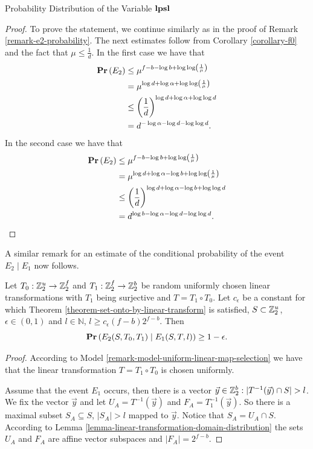 \begin{section}{Probability Distribution of the Variable \texorpdfstring{$\mathbf{lpsl}$}{lpsl}}
\begin{proof}
To prove the statement, we continue similarly as in the proof of Remark \ref{remark-e2-probability}. The next estimates follow from Corollary \ref{corollary-f0} and the fact that $\mu \leq \frac{1}{d}$. In the first case we have that
\[
\begin{split}
\mathbf{Pr}\left(E_2\right) 
	& \leq \mu ^ {f - b - \log b + \log \log \left( \frac{1}{\mu} \right)} \\
	& = \mu ^ {\log d + \log \alpha + \log \log \left( \frac{1}{\mu} \right)} \\
	& \leq \left(\frac{1}{d}\right) ^ {\log d + \log \alpha + \log \log d} \\
	& = d ^ {-\log \alpha - \log d - \log \log d} \text{.}
\end{split}
\]
In the second case we have that 
\[
\begin{split}
\mathbf{Pr}\left(E_2\right) 
	& \leq \mu ^ {f - b - \log b + \log \log \left( \frac{1}{\mu} \right)} \\
	& = \mu ^ {\log d + \log \alpha - \log b  + \log \log \left( \frac{1}{\mu} \right)} \\
	& \leq \left(\frac{1}{d}\right) ^ {\log d + \log \alpha - \log b + \log \log d} \\
	& = d ^ {\log b -\log \alpha - \log d - \log \log d} \text{.}
\end{split}
\]
\end{proof}

A similar remark for an estimate of the conditional probability of the event $E_2 \mid E_1$ now follows.
\begin{remark}
\label{remark-prob-l-length-chain}
Let $T_0: \mathbb{Z}_{2}^{u} \rightarrow \mathbb{Z}_{2}^{f}$ and $T_1: \mathbb{Z}_{2}^{f} \rightarrow \mathbb{Z}_{2}^{b}$ be random uniformly chosen linear transformations with $T_1$ being surjective and $T = T_1 \circ T_0$. Let $c_\epsilon$ be a constant for which Theorem \ref{theorem-set-onto-by-linear-transform} is satisfied, $S \subset \mathbb{Z}_{2}^{u}$, $\epsilon \in (0, 1)$ and $l \in \mathbb{N}$, $l \geq c_{\epsilon}(f - b)2 ^ {f - b}$. Then
\[
	\mathbf{Pr}\left(E_2(S, T_0, T_1) \mid E_1(S, T, l)\right) \geq 1 - \epsilon \text{.}
\]
\end{remark}
\begin{proof}
According to Model \ref{remark-model-uniform-linear-map-selection} we have that the linear transformation $T = T_1 \circ T_0$ is chosen uniformly.

Assume that the event $E_1$ occurs, then there is a vector $\vec{y} \in \mathbb{Z}_{2}^{b}: |T^{-1}(\vec{y}) \cap S| > l$. We fix the vector $\vec{y}$ and let $U_A = T^{-1}(\vec{y})$ and $F_A = T_1^{-1}(\vec{y})$. So there is a maximal subset $S_A \subseteq S$, $|S_A| > l$ mapped to $\vec{y}$. Notice that $S_A = U_A \cap S$. According to Lemma \ref{lemma-linear-transformation-domain-distribution} the sets $U_A$ and $F_A$ are affine vector subspaces and $|F_A| = 2 ^ {f - b}$.


\end{proof}
\end{section}
